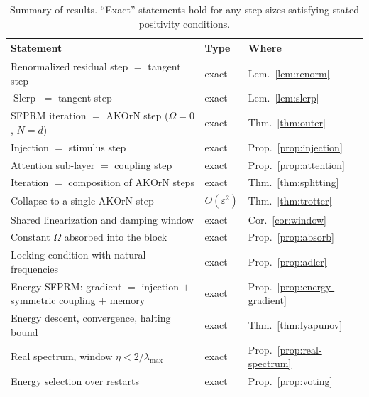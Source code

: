 \documentclass{article}
\theoremstyle{plain}
\theoremstyle{definition}
\theoremstyle{remark}
\newcommand{\Slerp}{\operatorname{Slerp}}
\begin{document}
\begin{table}[t]
  \caption{Summary of results. ``Exact'' statements hold for any step sizes satisfying stated
  positivity conditions.}
  \label{tab:summary}
  \vskip 0.1in
  \begin{center}
  \begin{small}
  \begin{tabular}{@{}p{}ll@{}}
    \toprule
    Statement & Type & Where \\
    \midrule
    Renormalized residual step $=$ tangent step & exact & Lem.~\ref{lem:renorm} \\
    $\Slerp$ $=$ tangent step & exact & Lem.~\ref{lem:slerp} \\
    SFPRM iteration $=$ AKOrN step ($\Omega=0$, $N=d$) & exact & Thm.~\ref{thm:outer} \\
    Injection $=$ stimulus step & exact & Prop.~\ref{prop:injection} \\
    Attention sub-layer $=$ coupling step & exact & Prop.~\ref{prop:attention} \\
    Iteration $=$ composition of AKOrN steps & exact & Thm.~\ref{thm:splitting} \\
    Collapse to a single AKOrN step & $O(\varepsilon^2)$ & Thm.~\ref{thm:trotter} \\
    Shared linearization and damping window & exact & Cor.~\ref{cor:window} \\
    Constant $\Omega$ absorbed into the block & exact & Prop.~\ref{prop:absorb} \\
    Locking condition with natural frequencies & exact & Prop.~\ref{prop:adler} \\
    \midrule
    Energy SFPRM: gradient $=$ injection $+$ symmetric coupling $+$ memory & exact & Prop.~\ref{prop:energy-gradient} \\
    Energy descent, convergence, halting bound & exact & Thm.~\ref{thm:lyapunov} \\
    Real spectrum, window $\eta<2/\lambda_{\max}$ & exact & Prop.~\ref{prop:real-spectrum} \\
    Energy selection over restarts & exact & Prop.~\ref{prop:voting} \\
    \bottomrule
  \end{tabular}
  \end{small}
  \end{center}
  \vskip -0.1in
\end{table}

\end{document}
